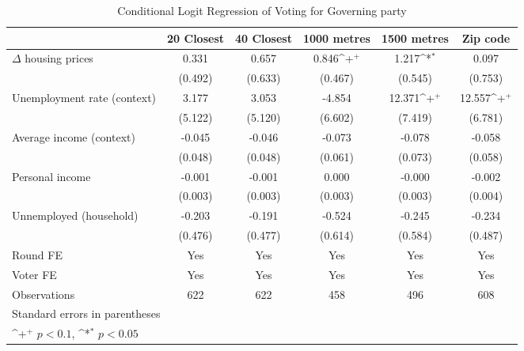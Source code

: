 \begin{table}[htbp]\centering
\def\sym#1{\ifmmode^{#1}\else\(^{#1}\)\fi}
\caption{Conditional Logit Regression of Voting for Governing party } \footnotesize \label{logit}
\begin{tabular}{l*{5}{c}}
\hline\hline
                    &\multicolumn{1}{c}{20 Closest}&\multicolumn{1}{c}{40 Closest}&\multicolumn{1}{c}{1000 metres}&\multicolumn{1}{c}{1500 metres}&\multicolumn{1}{c}{Zip code}\\
\hline
$\Delta$ housing prices&       0.331       &       0.657       &       0.846\sym{+}&       1.217\sym{*}&       0.097       \\
                    &     (0.492)       &     (0.633)       &     (0.467)       &     (0.545)       &     (0.753)       \\
[1em]
Unemployment rate (context)&       3.177       &       3.053       &      -4.854       &      12.371\sym{+}&      12.557\sym{+}\\
                    &     (5.122)       &     (5.120)       &     (6.602)       &     (7.419)       &     (6.781)       \\
[1em]
Average income (context)&      -0.045       &      -0.046       &      -0.073       &      -0.078       &      -0.058       \\
                    &     (0.048)       &     (0.048)       &     (0.061)       &     (0.073)       &     (0.058)       \\
[1em]
Personal income     &      -0.001       &      -0.001       &       0.000       &      -0.000       &      -0.002       \\
                    &     (0.003)       &     (0.003)       &     (0.003)       &     (0.003)       &     (0.004)       \\
[1em]
Unnemployed (household)&      -0.203       &      -0.191       &      -0.524       &      -0.245       &      -0.234       \\
                    &     (0.476)       &     (0.477)       &     (0.614)       &     (0.584)       &     (0.487)       \\
[1em]
\hline  Round FE    &         Yes       &         Yes       &         Yes       &         Yes       &         Yes       \\
[1em]
Voter FE            &         Yes       &         Yes       &         Yes       &         Yes       &         Yes       \\
\hline
Observations        &         622       &         622       &         458       &         496       &         608       \\
\hline\hline
\multicolumn{6}{l}{\footnotesize Standard errors in parentheses}\\
\multicolumn{6}{l}{\footnotesize \sym{+} \(p<0.1\), \sym{*} \(p<0.05\)}\\
\end{tabular}
\end{table}

